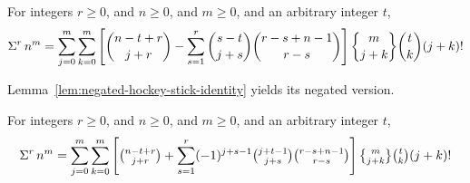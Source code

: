 \begin{proposition}
  For integers $r\geq0$, and $n\geq 0$, and $m\geq 0$,
  and an arbitrary integer $t$,
  \begin{align*}
    \KnuthRFoldSum{r}{n}{m}
    = \sum_{j=0}^{m} \sum_{k=0}^{m}
    \left[ \binom{n-t+r}{j+r} - \sum_{s=1}^{r} \binom{s-t}{j+s} \binom{r-s+n-1}{r-s} \right]
    \stirlingii{m}{j+k} \binom{t}{k} (j+k)!
  \end{align*}
\end{proposition}
Lemma~\eqref{lem:negated-hockey-stick-identity} yields its negated version.
\begin{proposition}
  For integers $r\geq0$, and $n\geq 0$, and $m\geq 0$,
  and an arbitrary integer $t$,
  \begin{align*}
    \KnuthRFoldSum{r}{n}{m}
    = \sum_{j=0}^{m} \sum_{k=0}^{m}
    \left[
      \tbinom{n-t+r}{j+r} + \sum_{s=1}^{r} (-1)^{j+s-1}
      \tbinom{j+t-1}{j+s} \tbinom{r-s+n-1}{r-s}
    \right]
    \tstirlingii{m}{j+k} \tbinom{t}{k} (j+k)!
  \end{align*}
\end{proposition}
